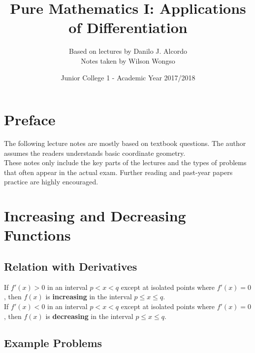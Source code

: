 \documentclass[hidelinks, a4paper, 12pt]{article}
\title{Pure Mathematics I: Applications of Differentiation}
\author{Based on lectures by Danilo J. Alcordo \\ Notes taken by Wilson Wongso}
\date{Junior College 1 - Academic Year 2017/2018}
\newcommand{\bd}{\textbf}
\newcommand{\n}{\\[\baselineskip]}
\begin{document}
    

    \maketitle
        
    \tableofcontents

    \section{Preface}
        The following lecture notes are mostly based on textbook \cite{neill2016cambridge} questions. The author assumes the readers understands basic coordinate geometry.\\[\baselineskip]
        These notes only include the key parts of the lectures and the types of problems that often appear in the actual exam.
        Further reading and past-year papers practice are highly encouraged.

    \section{Increasing and Decreasing Functions}
        \subsection{Relation with Derivatives}
            If $f'(x) > 0$ in an interval $p<x<q$ except at isolated points where $f'(x) = 0$, then $f(x)$ is \bd{increasing} in the interval $p\leq x \leq q$.\n
            If $f'(x) < 0$ in an interval $p<x<q$ except at isolated points where $f'(x) = 0$, then $f(x)$ is \bd{decreasing} in the interval $p\leq x \leq q$.
    
        \subsection{Example Problems}
\end{document}
